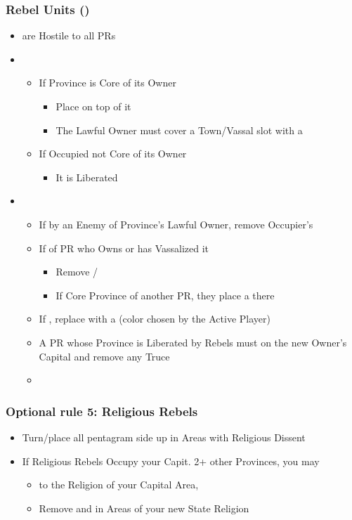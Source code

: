 \documentclass[10pt]{article}
\begin{document}
\subsubsection*{Rebel Units (\rebel)}
\begin{itemize}
	\item \rebels are Hostile to all PRs
	\item {}
	\begin{itemize}
		\item If Province is Core of its Owner
		\begin{itemize}
			\item Place \rebeltown on top of it
			\item The Lawful Owner must cover a Town/Vassal slot with a \cube
		\end{itemize}
		\item If Occupied  not Core of its Owner
		\begin{itemize}
			\item It is Liberated
		\end{itemize}
	\end{itemize}
	\item {}
	\begin{itemize}
		\item If  by an Enemy of Province's Lawful Owner, remove Occupier's \town
		\item If  of PR who Owns or has Vassalized it
		\begin{itemize}
			\item Remove \town/\vassal
			\item If Core Province of another PR, they place a \town there
		\end{itemize}
		\item If , replace \town with a \dnpr (color chosen by the Active Player)
		\item A PR whose Province is Liberated by Rebels must  on the new Owner's Capital and remove any Truce
		\item {}
	\end{itemize}
\end{itemize}
\subsubsection*{Optional rule 5: Religious Rebels}
\begin{itemize}
	\item Turn/place all \rebeltowns pentagram side up in Areas with Religious Dissent
	\item If Religious Rebels Occupy your Capit.  2+ other Provinces, you may
	\begin{itemize}
		\item {} to the Religion of your Capital Area, 
		\item Remove \rebels and \rebeltowns in Areas of your new State Religion
	\end{itemize}
\end{itemize}
\end{document}
